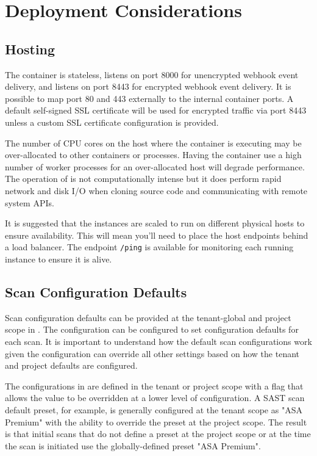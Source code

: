 \section{Deployment Considerations}

\subsection{Hosting}

The \cxoneflow container is stateless, listens on port 8000 for unencrypted webhook event delivery, 
and listens on port 8443 for encrypted webhook event delivery.  It is possible to map port 80 and 443
externally to the internal container ports.  A default self-signed SSL certificate will be used
for encrypted traffic via port 8443 unless a custom SSL certificate configuration is provided.  

The number of CPU cores on the host where the container is executing may be over-allocated to other
containers or processes.  Having the container use a high number of worker processes for an over-allocated
host will degrade performance.  The operation of \cxoneflow is not computationally intense
but it does perform rapid network and disk I/O when cloning source code and communicating with
remote system APIs.

It is suggested that the \cxoneflow instances are scaled to run on different physical hosts to
ensure availability.  This will mean you'll need to place the \cxoneflow host endpoints behind 
a load balancer.  The \cxoneflow endpoint \texttt{/ping} is available for monitoring each
running instance to ensure it is alive.

\subsection{Scan Configuration Defaults}\label{sec:deployment-scan-defaults}

Scan configuration defaults can be provided at the tenant-global and project scope
in \cxone.  The \cxoneflow configuration can be configured to set configuration
defaults for each scan.  It is important to understand how the \cxone default
scan configurations work given the \cxoneflow configuration can override all other
settings based on how the tenant and project defaults are configured.

The configurations in \cxone are defined in the tenant or project scope with a
flag that allows the value to be overridden at a lower level of configuration.  A
SAST scan default preset, for example, is generally configured at the tenant scope
as "ASA Premium" with the ability to override the preset at the project scope.  The
result is that initial scans that do not define a preset at the project scope or
at the time the scan is initiated use the globally-defined preset "ASA Premium".

